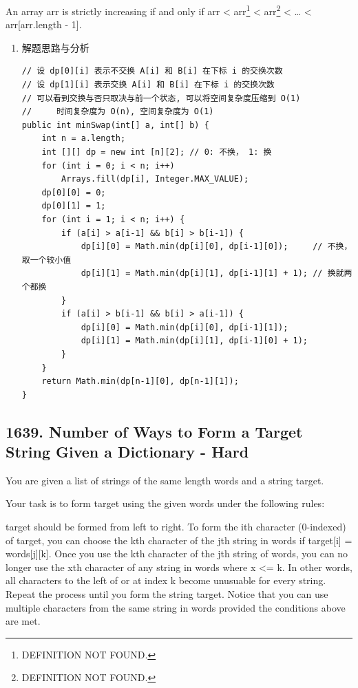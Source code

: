 \documentclass[9pt, b5paaper]{book}
\begin{document}
An array arr is strictly increasing if and only if arr\footnotemark[1]{} < arr\footnote{DEFINITION NOT FOUND.} < arr\footnote{DEFINITION NOT FOUND.} < \ldots{} < arr[arr.length - 1].
\begin{enumerate}
\item 解题思路与分析
\label{sec-1-2-7-1}
\begin{verbatim}
// 设 dp[0][i] 表示不交换 A[i] 和 B[i] 在下标 i 的交换次数
// 设 dp[1][i] 表示交换 A[i] 和 B[i] 在下标 i 的交换次数
// 可以看到交换与否只取决与前一个状态, 可以将空间复杂度压缩到 O(1)
//     时间复杂度为 O(n), 空间复杂度为 O(1)
public int minSwap(int[] a, int[] b) {
    int n = a.length;
    int [][] dp = new int [n][2]; // 0: 不换， 1: 换
    for (int i = 0; i < n; i++) 
        Arrays.fill(dp[i], Integer.MAX_VALUE);
    dp[0][0] = 0;
    dp[0][1] = 1;
    for (int i = 1; i < n; i++) {
        if (a[i] > a[i-1] && b[i] > b[i-1]) {
            dp[i][0] = Math.min(dp[i][0], dp[i-1][0]);     // 不换，取一个较小值
            dp[i][1] = Math.min(dp[i][1], dp[i-1][1] + 1); // 换就两个都换
        }
        if (a[i] > b[i-1] && b[i] > a[i-1]) {
            dp[i][0] = Math.min(dp[i][0], dp[i-1][1]); 
            dp[i][1] = Math.min(dp[i][1], dp[i-1][0] + 1);
        }
    }
    return Math.min(dp[n-1][0], dp[n-1][1]);
}
\end{verbatim}
\end{enumerate}

\subsection{1639. Number of Ways to Form a Target String Given a Dictionary - Hard}
\label{sec-1-2-8}
You are given a list of strings of the same length words and a string target.

Your task is to form target using the given words under the following rules:

target should be formed from left to right.
To form the ith character (0-indexed) of target, you can choose the kth character of the jth string in words if target[i] = words[j][k].
Once you use the kth character of the jth string of words, you can no longer use the xth character of any string in words where x <= k. In other words, all characters to the left of or at index k become unusuable for every string.
Repeat the process until you form the string target.
Notice that you can use multiple characters from the same string in words provided the conditions above are met.
\end{document}
